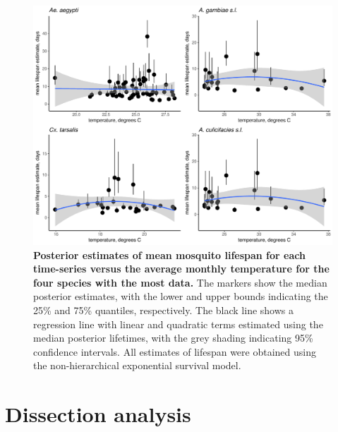 \documentclass[12pt]{article}
\begin{document}
\begin{figure}[h]
	\centerline{\includegraphics[width=1\textwidth]{./Figure_files/mrr_ThreeSpeciesVersusTemperature.pdf}}
	\caption{\textbf{Posterior estimates of mean mosquito lifespan for each time-series versus the average monthly temperature for the four species with the most data.} The markers show the median posterior estimates, with the lower and upper bounds indicating the 25\% and 75\% quantiles, respectively. The black line shows a regression line with linear and quadratic terms estimated using the median posterior lifetimes, with the grey shading indicating 95\% confidence intervals. All estimates of lifespan were obtained using the non-hierarchical exponential survival model.}\label{fig:mrr_ThreeSpeciesVersusTemperature}
\end{figure}

\section{Dissection analysis}
\end{document}
